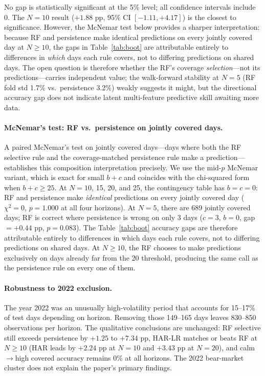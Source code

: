 \documentclass[11pt]{article}
\begin{document}
No gap is statistically significant at the 5\% level; all confidence intervals include 0. The $N = 10$ result ($+1.88$ pp, 95\% CI $[-1.11, +4.17]$) is the closest to significance. However, the McNemar test below provides a sharper interpretation: because RF and persistence make identical predictions on every jointly covered day at $N \geq 10$, the gaps in Table~\ref{tab:boot} are attributable entirely to differences in \emph{which} days each rule covers, not to differing predictions on shared days. The open question is therefore whether the RF's coverage \emph{selection}---not its predictions---carries independent value; the walk-forward stability at $N = 5$ (RF fold std 1.7\% vs.\ persistence 3.2\%) weakly suggests it might, but the directional accuracy gap does not indicate latent multi-feature predictive skill awaiting more data.

\paragraph{McNemar's test: RF vs.\ persistence on jointly covered days.}
A paired McNemar's test on jointly covered days---days where both the RF selective rule and the coverage-matched persistence rule make a prediction---establishes this composition interpretation precisely. We use the mid-$p$ McNemar variant, which is exact for small $b + c$ and coincides with the chi-squared form when $b + c \geq 25$. At $N = 10$, 15, 20, and 25, the contingency table has $b = c = 0$: RF and persistence make \emph{identical} predictions on every jointly covered day ($\chi^2 = 0$, $p = 1.000$ at all four horizons). At $N = 5$, there are 689 jointly covered days; RF is correct where persistence is wrong on only 3 days ($c = 3$, $b = 0$, gap $= {+}0.44$ pp, $p = 0.083$). The Table~\ref{tab:boot} accuracy gaps are therefore attributable entirely to differences in which days each rule covers, not to differing predictions on shared days. At $N \geq 10$, the RF chooses to make predictions exclusively on days already far from the 20 threshold, producing the same call as the persistence rule on every one of them.

\paragraph{Robustness to 2022 exclusion.}
The year 2022 was an unusually high-volatility period that accounts for 15--17\% of test days depending on horizon. Removing those 149--165 days leaves 830--850 observations per horizon. The qualitative conclusions are unchanged: RF selective still exceeds persistence by $+1.25$ to $+7.34$ pp, HAR-LR matches or beats RF at $N \geq 10$ (HAR leads by $+2.24$ pp at $N = 10$ and $+3.43$ pp at $N = 20$), and calm$\to$high covered accuracy remains 0\% at all horizons. The 2022 bear-market cluster does not explain the paper's primary findings.
\end{document}
